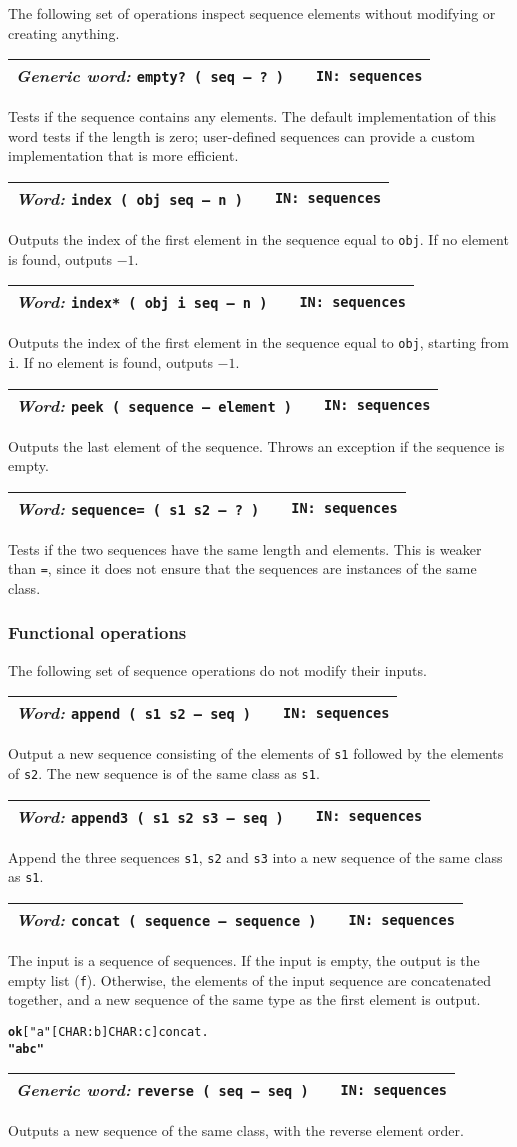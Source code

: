 \documentclass{report}
\newcommand{\tto}{\symbol{123}}
\newcommand{\ttc}{\symbol{125}}
\newcommand{\ordinaryword}[3]{\index{#1}
\emph{Word:} \texttt{#2} &&\texttt{IN: #3}}
\newcommand{\genericword}[3]{\index{#1}
\emph{Generic word:} \texttt{#2} &&\texttt{IN: #3}}
\newcommand{\wordtable}[1]{

\begin{tabularx}{12cm}[t]{lXr}
\hline
#1\\
\hline
\end{tabularx}

}
\begin{document}
The following set of operations inspect sequence elements without modifying or creating anything.

\wordtable{
\genericword{empty?}{empty?~( seq -- ?~)}{sequences}
}
Tests if the sequence contains any elements. The default implementation of this word tests if the length is zero; user-defined sequences can provide a custom implementation that is more efficient.
\wordtable{
\ordinaryword{index}{index ( obj seq -- n )}{sequences}
}
Outputs the index of the first element in the sequence equal to \texttt{obj}. If no element is found, outputs $-1$.
\wordtable{
\ordinaryword{index*}{index* ( obj i seq -- n )}{sequences}
}
Outputs the index of the first element in the sequence equal to \texttt{obj}, starting from \texttt{i}. If no element is found, outputs $-1$.
\wordtable{
\ordinaryword{peek}{peek ( sequence -- element )}{sequences}
}
Outputs the last element of the sequence. Throws an exception if the sequence is empty.
\wordtable{
\ordinaryword{sequence=}{sequence= ( s1 s2 -- ?~)}{sequences}
}
Tests if the two sequences have the same length and elements. This is weaker than \texttt{=}, since it does not ensure that the sequences are instances of the same class.

\subsubsection{Functional operations}

The following set of sequence operations do not modify their inputs.

\wordtable{
\ordinaryword{append}{append ( s1 s2 -- seq )}{sequences}
}
Output a new sequence consisting of the elements of \texttt{s1} followed by the elements of \texttt{s2}. The new sequence is of the same class as \texttt{s1}.
\wordtable{
\ordinaryword{append3}{append3 ( s1 s2 s3 -- seq )}{sequences}
}
Append the three sequences \texttt{s1}, \texttt{s2} and \texttt{s3} into a new sequence of the same class as \texttt{s1}.
\wordtable{
\ordinaryword{concat}{concat ( sequence -- sequence )}{sequences}
}
The input is a sequence of sequences. If the input is empty, the output is the empty list (\texttt{f}). Otherwise, the elements of the input sequence are concatenated together, and a new sequence of the same type as the first element is output.
\begin{alltt}
\textbf{ok} [ "a" [ CHAR: b ] \tto CHAR: c \ttc ] concat .
\textbf{"abc"}
\end{alltt}
\wordtable{
\genericword{reverse}{reverse ( seq -- seq )}{sequences}
}
Outputs a new sequence of the same class, with the reverse element order.
\end{document}
